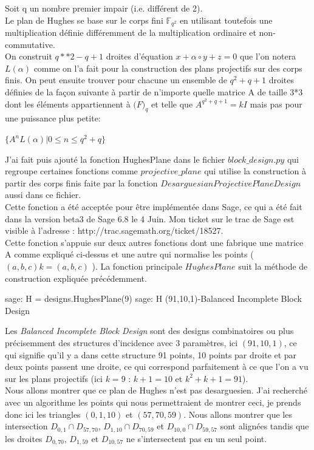 \documentclass[a4paper]{article}
\begin{document}
Soit q un nombre premier impair (i.e. différent de 2).\\
Le plan de Hughes se base sur le corps fini $\mathbb{F}_{q^2}$ en utilisant toutefois une multiplication définie différemment de la multiplication ordinaire et non-commutative.\\
On construit $q**2-q+1$ droites d'équation $x + \alpha \circ y + z = 0$ que l'on notera $L(\alpha)$ comme on l'a fait pour la construction des plans projectifs sur des corps finis. On peut ensuite trouver pour chacune un ensemble de $q^2 + q + 1$ droites définies de la façon suivante à partir de n'importe quelle matrice A de taille 3*3 dont les éléments appartiennent à $\mathbb(F)_q$ et telle que $A^{q^2+q+1}=kI$ mais pas pour une puissance plus petite:
\begin{center}
 $ \{A^nL(\alpha) | 0 \leq n \leq q^2 + q\}$
\end{center}
J'ai fait puis ajouté la fonction HughesPlane dans le fichier $block\_design.py$ qui regroupe certaines fonctions comme $projective\_plane$ qui utilise la construction à partir des corps finis faite par la fonction $DesarguesianProjectivePlaneDesign$ aussi dans ce fichier.\\ Cette fonction a été acceptée pour être implémentée dans Sage, ce qui a été fait dans la version beta3 de Sage 6.8 le 4 Juin.
Mon ticket sur le trac de Sage est visible à l'adresse : http://trac.sagemath.org/ticket/18527.\vspace{1\baselineskip}\\
Cette fonction s'appuie sur deux autres fonctions dont une fabrique une matrice A comme expliqué ci-dessus et une autre qui normalise les points ( $(a,b,c)k = (a,b,c)$ ). La fonction principale $HughesPlane$ suit la méthode de construction expliquée précédemment.
\begin{sageverbatim}
 sage: H = designs.HughesPlane(9)
 sage: H
 (91,10,1)-Balanced Incomplete Block Design
\end{sageverbatim}
Les \textit{Balanced Incomplete Block Design} sont des designs combinatoires ou plus précisemment des structures d'incidence avec 3 paramètres, ici $(91, 10, 1)$, ce qui signifie qu'il y a dans cette structure 91 points, 10 points par droite et par deux points passent une droite, ce qui correspond parfaitement à ce que l'on a vu sur les plans projectifs (ici $k=9$ : $k+1=10$ et $k^2+k+1=91$).\\
Nous allons montrer que ce plan de Hughes n'est pas desarguesien. J'ai recherché avec un algorithme les points qui nous permettraient de montrer ceci, je prends donc ici les triangles $(0,1,10)$ et $(57, 70, 59)$. Nous allons montrer que les intersection $D_{0,1} \cap D_{57,70}$, $D_{1,10} \cap D_{70,59}$ et $D_{10,0} \cap D_{59,57}$ sont alignées tandis que les droites $D_{0,70}$, $D_{1,59}$ et $D_{10,57}$ ne s'intersectent pas en un seul point.
\end{document}
